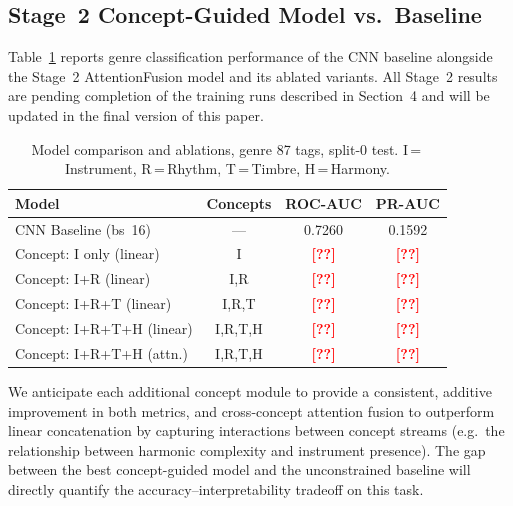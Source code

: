 \documentclass[sigconf,nonacm]{acmart}
\newcommand{\res}[1]{\textcolor{red}{\textbf{[#1]}}}
\begin{document}
\subsection{Stage~2 Concept-Guided Model vs.\ Baseline}

Table~\ref{tab:comparison} reports genre classification performance of the CNN baseline
alongside the Stage~2 AttentionFusion model and its ablated variants. All Stage~2 results are
pending completion of the training runs described in Section~4 and will be updated in the
final version of this paper.

\begin{table}[h]
  \caption{%
           Model comparison and ablations, genre 87 tags, split-0 test.
           I\,=\,Instrument, R\,=\,Rhythm, T\,=\,Timbre, H\,=\,Harmony.}
  \label{tab:comparison}
  \begin{tabular}{lccc}
    \toprule
    Model & Concepts & ROC-AUC & PR-AUC \\
    \midrule
    CNN Baseline (bs~16)         & ---     & 0.7260        & 0.1592        \\
    \midrule
    Concept: I only (linear)     & I       & \res{??}      & \res{??}      \\
    Concept: I+R (linear)        & I,R     & \res{??}      & \res{??}      \\
    Concept: I+R+T (linear)      & I,R,T   & \res{??}      & \res{??}      \\
    Concept: I+R+T+H (linear)    & I,R,T,H & \res{??}      & \res{??}      \\
    Concept: I+R+T+H (attn.)     & I,R,T,H & \res{??}      & \res{??}      \\
    \bottomrule
  \end{tabular}
\end{table}

We anticipate each additional concept module to provide a consistent, additive improvement in
both metrics, and cross-concept attention fusion to outperform linear concatenation by capturing
interactions between concept streams (e.g.\ the relationship between harmonic complexity and
instrument presence). The gap between the best concept-guided model and the unconstrained
baseline will directly quantify the accuracy--interpretability tradeoff on this task.

\end{document}
